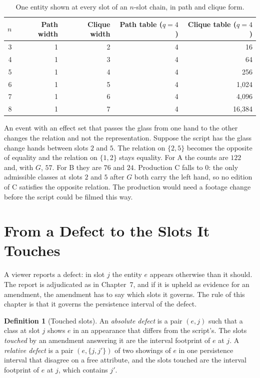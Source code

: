 \documentclass[11pt,twoside,openright]{book}
\theoremstyle{plain}
\theoremstyle{definition}
\newtheorem{definition}[theorem]{Definition}
\theoremstyle{remark}
\begin{document}
\begin{table}[ht]
\centering
\begin{tabular}{@{}rrrrr@{}}
\toprule
$n$ & Path width & Clique width & Path table ($q=4$) & Clique table ($q=4$)\\
\midrule
3 & 1 & 2 & 4 & 16\\
4 & 1 & 3 & 4 & 64\\
5 & 1 & 4 & 4 & 256\\
6 & 1 & 5 & 4 & 1,024\\
7 & 1 & 6 & 4 & 4,096\\
8 & 1 & 7 & 4 & 16,384\\
\bottomrule
\end{tabular}
\caption{One entity shown at every slot of an $n$-slot chain, in path and clique form.}\label{tab:widths}
\end{table}

An event with an effect set that passes the glass from one hand to the other changes the relation and not the representation. Suppose the script has the glass change hands between slots $2$ and $5$. The relation on $\{2,5\}$ becomes the opposite of equality and the relation on $\{1,2\}$ stays equality. For A the counts are $122$ and, with $G$, $57$. For B they are $76$ and $24$. Production C falls to $0$: the only admissible classes at slots $2$ and $5$ after $G$ both carry the left hand, so no edition of C satisfies the opposite relation. The production would need a footage change before the script could be filmed this way.

\section{From a Defect to the Slots It Touches}\label{sec:defects}

A viewer reports a defect: in slot $j$ the entity $e$ appears otherwise than it should. The report is adjudicated as in Chapter~7, and if it is upheld as evidence for an amendment, the amendment has to say which slots it governs. The rule of this chapter is that it governs the persistence interval of the defect.

\begin{definition}[Touched slots]\label{def:touched}
An \emph{absolute defect} is a pair $(e,j)$ such that a class at slot $j$ shows $e$ in an appearance that differs from the script's. The slots \emph{touched} by an amendment answering it are the interval footprint of $e$ at $j$. A \emph{relative defect} is a pair $(e,\{j,j'\})$ of two showings of $e$ in one persistence interval that disagree on a free attribute, and the slots touched are the interval footprint of $e$ at $j$, which contains $j'$.
\end{definition}
\end{document}

